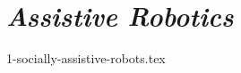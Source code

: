 \section{\emph{Assistive Robotics}}
\label{sec:sociallyassistiverobots}

{1-socially-assistive-robots.tex}
